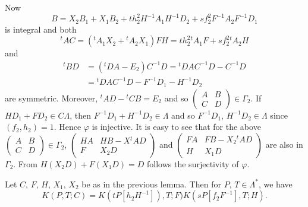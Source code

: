 Now
$$
B=X_{2}B_{1}+X_{1}B_{2}+th^{2}_{2}H^{-1}A_{1}H^{-1}D_{2}+sf^{2}_{2}F^{-1}A_{2}F^{-1}D_{1} 
$$
is integral and both 
$$
{}^{t}AC=({}^{t}A_{1}X_{2}+{}^{t}A_{2}X_{1})FH=th^{2}_{2}{}^{t}A_{1}F+sf^{2}_{2}{}^{t}A_{2}H
$$
and 
\begin{align*}
{}^{t}BD&=({}^{t}DA-E_{2})C^{-1}D={}^{t}DAC^{-1}D-C^{-1}D\\
&={}^{t}DAC^{-1}D-F^{-1}D_{1}-H^{-1}D_{2}
\end{align*}
are symmetric. Moreover, ${}^{t}AD-{}^{t}CB=E_{2}$ and so
$\left(\begin{smallmatrix} A & B\\ C & D
\end{smallmatrix}\right)\in\Gamma_{2}$. If $HD_{1}+FD_{2}\in
C\Lambda$, then $F^{-1}D_{1}+H^{-1}D_{2}\in\Lambda$ and so
$F^{-1}D_{1}$, $H^{-1}D_{2}\in\Lambda$ since $(f_{2},h_{2})=1$. Hence
$\varphi$ is injective. It is easy to see that for the above
$\left(\begin{smallmatrix} A & B\\ C & D
\end{smallmatrix}\right)\in\Gamma_{2}$, $\left(\begin{smallmatrix} HA
  & HB-X{}^{t}AD\\ F & X_{2}D\end{smallmatrix}\right)$ and
  $\left(\begin{smallmatrix} FA & FB-X_{2}{}^{t}AD\\ H & X_{1}D
  \end{smallmatrix}\right)$ are also in $\Gamma_{2}$. From
  $H(X_{2}D)+F(X_{1}D)=D$ follows the surjectivity of $\varphi$.

\begin{sublemma}\label{c1:lem-1.5.17}
Let $C$, $F$, $H$, $X_{1}$, $X_{2}$ be as in the previous lemma. Then
for $P$, $T\in \Lambda^{\ast}$, we have
$$
K(P,T;C)=K(tP[h_{2}H^{-1}]),T;F)K(sP[f_{2}F^{-1}],T;H).
$$
\end{sublemma}


